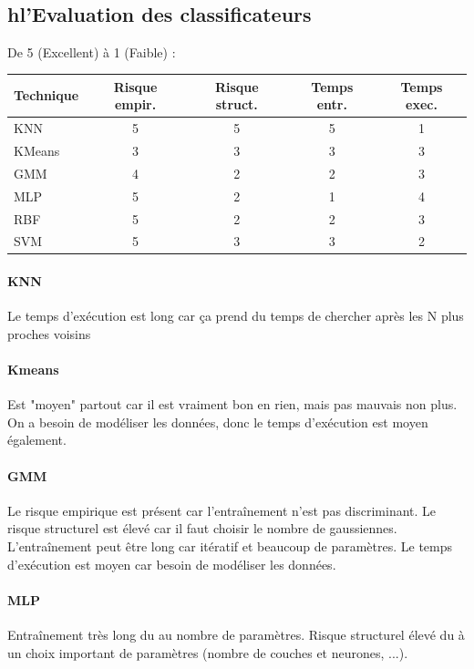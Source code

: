 \documentclass[letterpaper, 12pt]{article}
\newcommand{\alinea}{
\hspace*{0.5cm}}
\begin{document}
		\subsection{\\hl{'Evaluation des classificateurs}}
			\alinea De 5 (Excellent) à 1 (Faible) :
				\begin{center}
					\begin{tabular}{|l|c|c|c|c|}
						\hline
						\textbf{Technique} & \textbf{Risque empir.} & \textbf{Risque struct.} & \textbf{Temps entr.} & 
							\textbf{Temps exec.}\\
						\hline
						KNN & 5 & 5 & 5 & 1\\
						\hline
						KMeans & 3 & 3 & 3 & 3 \\
						\hline
						GMM & 4 & 2 & 2 & 3 \\
						\hline
						MLP & 5 & 2 & 1 & 4 \\
						\hline
						RBF & 5 & 2 & 2 & 3 \\
						\hline
						SVM & 5 & 3 & 3 & 2 \\
						\hline
					\end{tabular}
				\end{center}
			\paragraph{KNN}
				\alinea Le temps d'exécution est long car ça prend du temps de chercher après les N plus proches voisins
			\paragraph{Kmeans}
				\alinea Est "moyen" partout car il est vraiment bon en rien, mais pas mauvais
					non plus. On a besoin de modéliser les données, donc le temps d'exécution est moyen également.
			\paragraph{GMM}
				\alinea Le risque empirique est présent car l'entraînement n'est pas discriminant. Le risque structurel est élevé car
					il faut choisir le nombre de gaussiennes. L'entraînement peut être long car itératif et beaucoup de paramètres.
					Le temps d'exécution est moyen car besoin de modéliser les données.
			\paragraph{MLP}
				\alinea Entraînement très long du au nombre de paramètres. Risque structurel élevé du à un choix important de paramètres
					(nombre de couches et neurones, ...).
\end{document}
